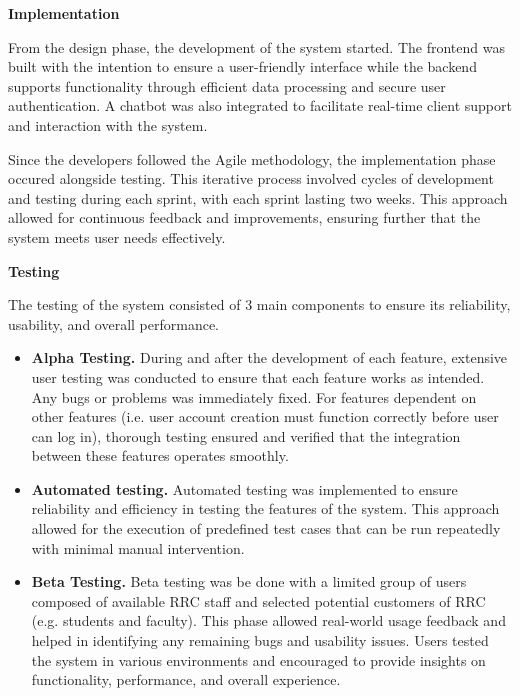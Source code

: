 \textbf{Implementation}

From the design phase, the development of the system started. The frontend was built with the intention to ensure a user-friendly interface while the backend supports functionality through efficient data processing and secure user authentication. A chatbot was also integrated to facilitate real-time client support and interaction with the system.

Since the developers followed the Agile methodology, the implementation phase occured alongside testing. This iterative process involved cycles of development and testing during each sprint, with each sprint lasting two weeks. This approach allowed for continuous feedback and improvements, ensuring further that the system meets user needs effectively.\newline

\textbf{Testing}

The testing of the system consisted of 3 main components to ensure its reliability, usability, and overall performance.

\begin{itemize}
	\item \textbf{Alpha Testing.} During and after the development of each feature, extensive user testing was conducted to ensure that each feature works as intended. Any bugs or problems was immediately fixed. For features dependent on other features (i.e. user account creation must function correctly before user can log in), thorough testing ensured and verified that the integration between these features operates smoothly.
	
	\item \textbf{Automated testing.} Automated testing was implemented to ensure reliability and efficiency in testing the features of the system. This approach allowed for the execution of predefined test cases that can be run repeatedly with minimal manual intervention.
	
	\item \textbf{Beta Testing.}  Beta testing was be done with a limited group of users composed of available RRC staff and selected potential customers of RRC (e.g. students and faculty). This phase allowed real-world usage feedback and helped in identifying any remaining bugs and usability issues. Users tested the system in various environments and encouraged to provide insights on functionality, performance, and overall experience.\newline
\end{itemize}

